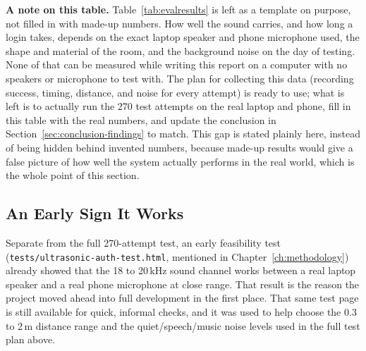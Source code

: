 \textbf{A note on this table.} Table~\ref{tab:evalresults} is left as a
template on purpose, not filled in with made-up numbers. How well the
sound carries, and how long a login takes, depends on the exact laptop
speaker and phone microphone used, the shape and material of the room, and
the background noise on the day of testing. None of that can be measured
while writing this report on a computer with no speakers or microphone to
test with. The plan for collecting this data (recording success, timing,
distance, and noise for every attempt) is ready to use; what is left is to
actually run the 270 test attempts on the real laptop and phone, fill in
this table with the real numbers, and update the conclusion in
Section~\ref{sec:conclusion-findings} to match. This gap is stated
plainly here, instead of being hidden behind invented numbers, because
made-up results would give a false picture of how well the system
actually performs in the real world, which is the whole point of this
section.

\subsection{An Early Sign It Works}

Separate from the full 270-attempt test, an early feasibility test
(\texttt{tests/\allowbreak ultrasonic-\allowbreak auth-\allowbreak test.html}, mentioned in
Chapter~\ref{ch:methodology}) already showed that the 18 to 20\,kHz sound
channel works between a real laptop speaker and a real phone microphone
at close range. That result is the reason the project moved ahead into
full development in the first place. That same test page is still
available for quick, informal checks, and it was used to help choose the
0.3 to 2\,m distance range and the quiet/speech/music noise levels used in
the full test plan above.
